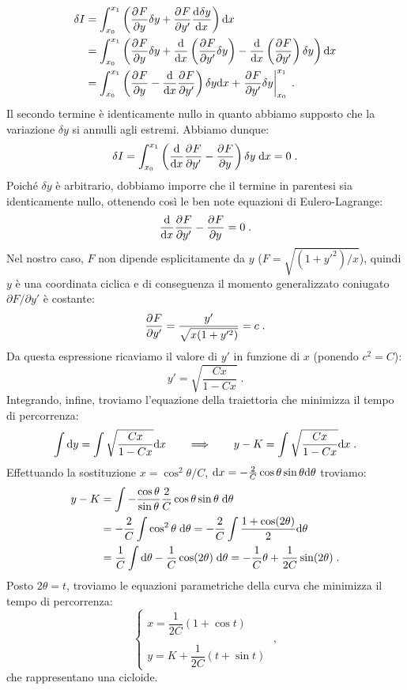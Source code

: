 \begin{align}
\delta I &= \int_{x_0}^{x_1}\left(\pdev{F}{y}\delta y+\pdev{F}{y'}\dev{\delta y}{x}\right)\diff{x} \notag \\
&= \int_{x_0}^{x_1}\left(\pdev{F}{y}\delta y+\frac{\diff}{\diff{x}}\left(\pdev{F}{y'}\delta y\right)-\frac{\diff}{\diff{x}}\left(\pdev{F}{y'}\right)\delta y\right)\diff{x} \notag \\
&= \int_{x_0}^{x_1}\left(\pdev{F}{y}-\frac{\diff}{\diff{x}}\pdev{F}{y'}\right)\delta y \diff{x}+\left.\pdev{F}{y'}\delta y\right|^{x_1}_{x_0}\;.
\end{align}
Il secondo termine è identicamente nullo in quanto abbiamo supposto che la variazione $\delta y$ si annulli agli estremi. Abbiamo dunque:
\begin{equation}
\delta I=\int_{x_0}^{x_1} \left(\frac{\diff}{\diff[x]}\pdev{F}{y'}-\pdev{F}{y}\right)\delta y\;\diff[x]=0\;.
\end{equation}
Poiché $\delta y$ è arbitrario, dobbiamo imporre che il termine in parentesi sia identicamente nullo, ottenendo così le ben note equazioni di Eulero-Lagrange:
\begin{equation}
\frac{\diff}{\diff[x]}\pdev{F}{y'}-\pdev{F}{y}=0\;.
\end{equation}
Nel nostro caso, $F$ non dipende esplicitamente da $y$ ($F=\sqrt{(1+y'^2)/x}$), quindi $y$ è una coordinata ciclica e di conseguenza il momento generalizzato coniugato $\partial F/\partial y'$ è costante:
\begin{equation}
\pdev{F}{y'}=\frac{y'}{\sqrt{x(1+y'^2)}}=c\;.
\end{equation}
Da questa espressione ricaviamo il valore di $y'$ in funzione di $x$ (ponendo $c^2=C$):
\begin{equation}
y'=\sqrt{\frac{Cx}{1-Cx}}\;.
\end{equation}
Integrando, infine, troviamo l'equazione della traiettoria che minimizza il tempo di percorrenza:
\begin{equation}
\int \diff[y]=\int \sqrt{\frac{Cx}{1-Cx}}\diff[x]\qquad \Longrightarrow\qquad  y-K=\int \sqrt{\frac{Cx}{1-Cx}}\diff[x]\;.
\end{equation}
Effettuando la sostituzione $x=\cos^2\theta/C$, $\diff[x]=-\frac{2}{C}\cos\theta\sin\theta\diff[\theta]$ troviamo:
\begin{align}
y-K&=\int -\frac{\cos\theta}{\sin\theta}\frac{2}{C}\cos\theta\sin\theta\;\diff[\theta] \notag \\
&= -\frac{2}{C}\int \cos^2\theta\;\diff[\theta]=-\frac{2}{C}\int \frac{1+\cos(2\theta)}{2}\diff[\theta] \notag \\
&=\frac{1}{C}\int \diff[\theta]-\frac{1}{C}\cos (2\theta)\;\diff[\theta]=-\frac{1}{C}\theta+\frac{1}{2C}\sin(2\theta)\;.
\end{align}
Posto $2\theta=t$, troviamo le equazioni parametriche della curva che minimizza il tempo di percorrenza:
\begin{equation}
\begin{cases}
x=\dfrac{1}{2C}(1+\cos t) \\
\\
y=K+\dfrac{1}{2C}(t+\sin t)
\end{cases}\;,
\end{equation}
che rappresentano una cicloide.
\pagebreak
